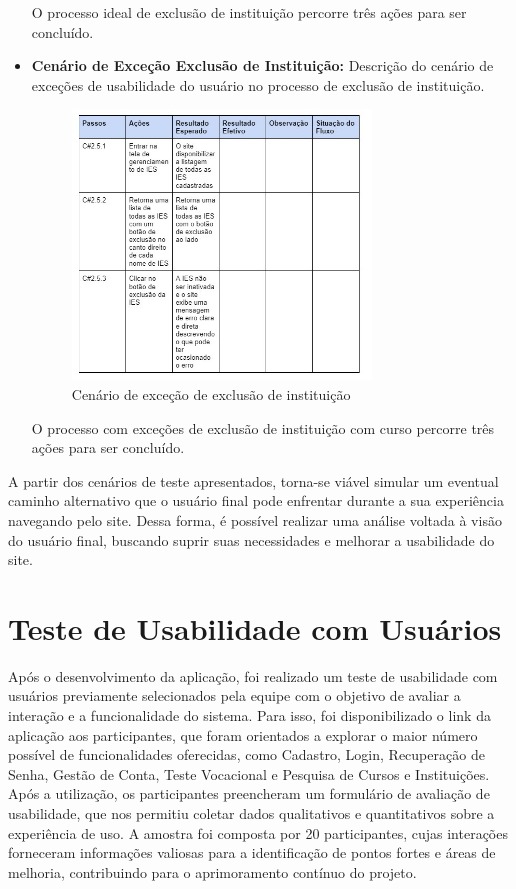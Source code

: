 \begin{itemize}
O processo ideal de exclusão de instituição percorre três ações para ser concluído.

\newpage

 \item \textbf{Cenário de Exceção Exclusão de Instituição:}
Descrição do cenário de exceções de usabilidade do usuário no processo de exclusão de instituição.

\begin{figure}[ht]
        \centering
\includegraphics[width=0.75\textwidth]{images/teste-exc-instituicao-excecao.jpg}
        \caption{Cenário de exceção de exclusão de instituição}
        \label{commitsAturo}
\end{figure}
O processo com exceções de exclusão de instituição com curso percorre três ações para ser concluído.

\end{itemize}

A partir dos cenários de teste apresentados, torna-se viável simular um eventual caminho alternativo que o usuário final pode enfrentar durante a sua experiência navegando pelo site. Dessa forma, é possível realizar uma análise voltada à visão do usuário final, buscando suprir suas necessidades e melhorar a usabilidade do site.


\section{Teste de Usabilidade com Usuários}
Após o desenvolvimento da aplicação, foi realizado um teste de usabilidade com usuários previamente selecionados pela equipe com o objetivo de avaliar a interação e a funcionalidade do sistema. Para isso, foi disponibilizado o link da aplicação aos participantes, que foram orientados a explorar o maior número possível de funcionalidades oferecidas, como Cadastro, Login, Recuperação de Senha, Gestão de Conta, Teste Vocacional e Pesquisa de Cursos e Instituições. Após a utilização, os participantes preencheram um formulário de avaliação de usabilidade, que nos permitiu coletar dados qualitativos e quantitativos sobre a experiência de uso. A amostra foi composta por 20 participantes, cujas interações forneceram informações valiosas para a identificação de pontos fortes e áreas de melhoria, contribuindo para o aprimoramento contínuo do projeto.

